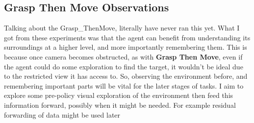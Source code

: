 


\subsection{Grasp Then Move Observations}
Talking about the Grasp\_ThenMove, literally have never ran this yet.
What I got from these experiments was that the agent can benefit from understanding its surroundings at a higher level, and more importantly remembering them. This is because once  camera becomes obstructed, as with \textbf{Grasp Then Move}, even if the agent could do some exploration to find the target, it wouldn't be ideal due to the restricted view it has access to. So, observing the environment before, and remembering important parts will be vital for the later stages of tasks. I aim to explore some pre-policy visual exploration of the environment then feed this information forward, possibly when it might be needed. For example residual forwarding of data might be used later 